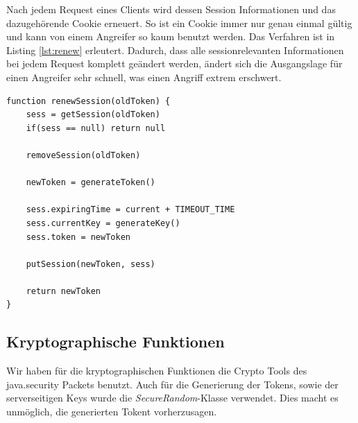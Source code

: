Nach jedem Request eines Clients wird dessen Session Informationen und das dazugehörende Cookie
erneuert. So ist ein Cookie immer nur genau einmal gültig und kann von einem Angreifer so kaum 
benutzt werden. Das Verfahren ist in Listing \ref{lst:renew} erleutert. Dadurch, dass alle 
sessionrelevanten Informationen bei jedem Request komplett geändert werden, ändert sich die
Ausgangslage für einen Angreifer sehr schnell, was einen Angriff extrem erschwert.
\newline
\begin{lstlisting}[caption=Erneuern einer Session,label={lst:renew}]
function renewSession(oldToken) {
    sess = getSession(oldToken)
    if(sess == null) return null

    removeSession(oldToken)

    newToken = generateToken()

    sess.expiringTime = current + TIMEOUT_TIME
    sess.currentKey = generateKey()
    sess.token = newToken

    putSession(newToken, sess)

    return newToken
}
\end{lstlisting}

\subsection{Kryptographische Funktionen}

Wir haben für die kryptographischen Funktionen die Crypto Tools des java.security Packets benutzt. Auch für die Generierung
der Tokens, sowie der serverseitigen Keys wurde die \textit{SecureRandom}-Klasse verwendet. Dies macht es unmöglich, die
generierten Tokent vorherzusagen.
